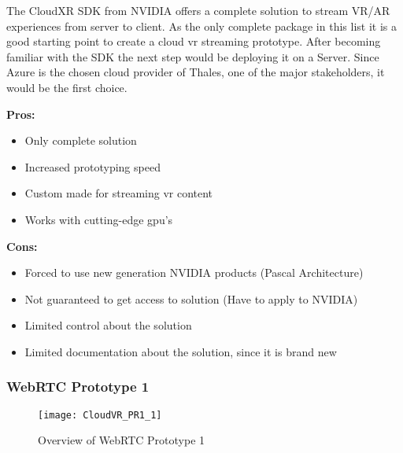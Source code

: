 The CloudXR SDK from NVIDIA offers a complete solution to stream VR/AR experiences from server to client. As the only complete package in this list it is a good starting point to create a cloud \acrshort{vr} streaming prototype. After becoming familiar with the SDK the next step would be deploying it on a Server. Since Azure is the chosen cloud provider of Thales, one of the major stakeholders, it would be the first choice. \\
\newline
\begin{varwidth}[t]{.5\textwidth}
\renewcommand\labelitemi{+}
\textbf{Pros:}
\begin{itemize}
\item Only complete solution
\item Increased prototyping speed
\item Custom made for streaming \acrshort{vr} content
\item Works with cutting-edge \acrshort{gpu}'s
\end{itemize}
\end{varwidth}
\hspace{4em}
\begin{varwidth}[t]{.5\textwidth}
\renewcommand\labelitemi{-}
\textbf{Cons:}
\begin{itemize}
\item Forced to use new generation NVIDIA products (Pascal Architecture)
\item Not guaranteed to get access to solution (Have to apply to NVIDIA)
\item Limited control about the solution
\item Limited documentation about the solution, since it is brand new
\end{itemize}
\end{varwidth}

\newpage

\subsubsection{WebRTC Prototype 1}
\begin{figure}[h!]
\caption{Overview of WebRTC Prototype 1}
\label{fig:pr11}
\texttt{[image: CloudVR\_PR1\_1]}
\end{figure}

